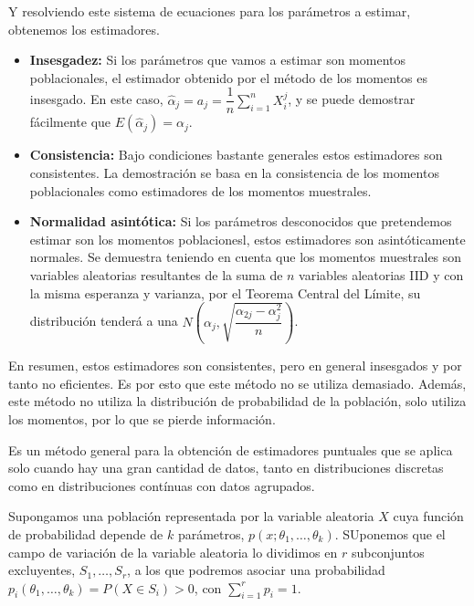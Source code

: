 Y resolviendo este sistema de ecuaciones para los par\'ametros a estimar, obtenemos los estimadores.

\begin{itemize}
\item \textbf{Insesgadez:} Si los par\'ametros que vamos a estimar son momentos poblacionales, el estimador obtenido por el m\'etodo de los momentos es insesgado.
En este caso, $\hat{\alpha}_j=a_j=\dfrac{1}{n}\sum_{i=1}^nX_i^j$, y se puede demostrar f\'acilmente que $E(\hat{\alpha}_j)=\alpha_j$.
\item \textbf{Consistencia:} Bajo condiciones bastante generales estos estimadores son consistentes. La demostraci\'on se basa en la consistencia de los momentos poblacionales como estimadores de los momentos muestrales.
\item \textbf{Normalidad asint\'otica:} Si los par\'ametros desconocidos que pretendemos estimar son los momentos poblacionesl, estos estimadores son asint\'oticamente normales.
Se demuestra teniendo en cuenta que los momentos muestrales son variables aleatorias resultantes de la suma de $n$ variables aleatorias IID y con la misma esperanza y varianza, por el Teorema Central del L\'imite, su distribuci\'on tender\'a a una $N(\alpha_j,\sqrt{\dfrac{\alpha_{2j}-\alpha_j^2}{n}})$.

\end{itemize}

En resumen, estos estimadores son consistentes, pero en general insesgados y por tanto no eficientes. Es por esto que este m\'etodo no se utiliza demasiado. Adem\'as, este m\'etodo no utiliza la distribuci\'on de probabilidad de la poblaci\'on, solo utiliza los momentos, por lo que se pierde informaci\'on.


Es un m\'etodo general para la obtenci\'on de estimadores puntuales que se aplica solo cuando hay una gran cantidad de datos, tanto en distribuciones discretas como en distribuciones cont\'inuas con datos agrupados.

Supongamos una poblaci\'on representada por la variable aleatoria $X$ cuya funci\'on de probabilidad depende de $k$ par\'ametros, $p(x;\theta_1,\ldots,\theta_k)$. SUponemos que el campo de variaci\'on de la variable aleatoria lo dividimos en $r$ subconjuntos excluyentes, $S_1,\ldots,S_r$, a los que podremos asociar una probabilidad $p_i(\theta_1,\ldots,\theta_k)=P(X\in S_i)>0$, con $\sum_{i=1}^rp_i=1$.

